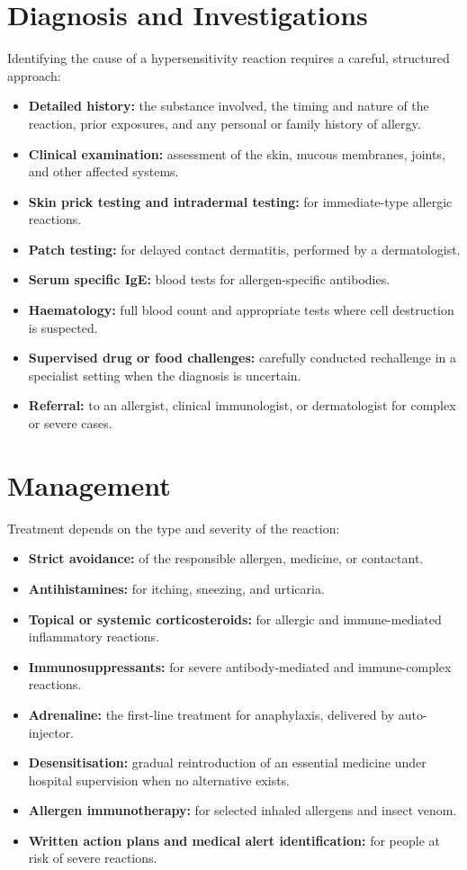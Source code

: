 \section*{Diagnosis and Investigations}
Identifying the cause of a hypersensitivity reaction requires a careful, structured approach:

\begin{itemize}
    \item \textbf{Detailed history:} the substance involved, the timing and nature of the reaction, prior exposures, and any personal or family history of allergy.
    \item \textbf{Clinical examination:} assessment of the skin, mucous membranes, joints, and other affected systems.
    \item \textbf{Skin prick testing and intradermal testing:} for immediate-type allergic reactions.
    \item \textbf{Patch testing:} for delayed contact dermatitis, performed by a dermatologist.
    \item \textbf{Serum specific IgE:} blood tests for allergen-specific antibodies.
    \item \textbf{Haematology:} full blood count and appropriate tests where cell destruction is suspected.
    \item \textbf{Supervised drug or food challenges:} carefully conducted rechallenge in a specialist setting when the diagnosis is uncertain.
    \item \textbf{Referral:} to an allergist, clinical immunologist, or dermatologist for complex or severe cases.
\end{itemize}

\section*{Management}
Treatment depends on the type and severity of the reaction:

\begin{itemize}
    \item \textbf{Strict avoidance:} of the responsible allergen, medicine, or contactant.
    \item \textbf{Antihistamines:} for itching, sneezing, and urticaria.
    \item \textbf{Topical or systemic corticosteroids:} for allergic and immune-mediated inflammatory reactions.
    \item \textbf{Immunosuppressants:} for severe antibody-mediated and immune-complex reactions.
    \item \textbf{Adrenaline:} the first-line treatment for anaphylaxis, delivered by auto-injector.
    \item \textbf{Desensitisation:} gradual reintroduction of an essential medicine under hospital supervision when no alternative exists.
    \item \textbf{Allergen immunotherapy:} for selected inhaled allergens and insect venom.
    \item \textbf{Written action plans and medical alert identification:} for people at risk of severe reactions.
\end{itemize}

